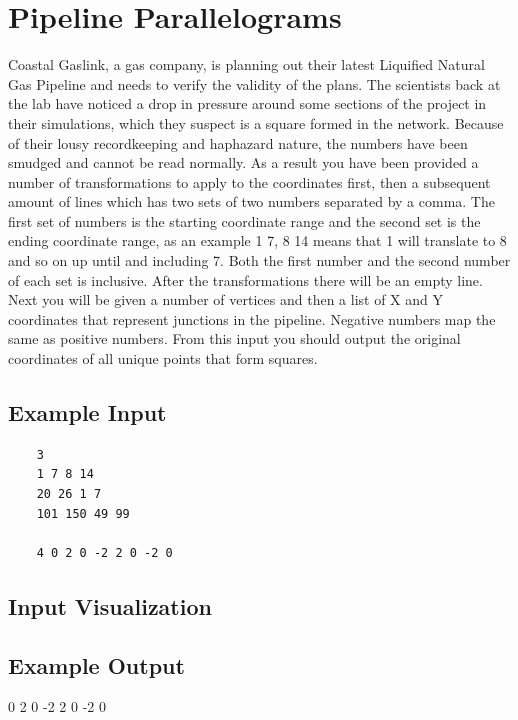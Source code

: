 \documentclass{article}
\begin{document}
\section{Pipeline Parallelograms}
Coastal Gaslink, a gas company, is planning out their latest Liquified Natural Gas Pipeline and needs to verify the validity of the plans. The scientists back at the lab have noticed a drop in pressure around some sections of the project in their simulations, which they suspect is a square formed in the network. Because of their lousy recordkeeping and haphazard nature, the numbers have been smudged and cannot be read normally. As a result you have been provided a number of transformations to apply to the coordinates first, then a subsequent amount of lines which has two sets of two numbers separated by a comma. The first set of numbers is the starting coordinate range and the second set is the ending coordinate range, as an example 1 7, 8 14 means that 1 will translate to 8 and so on up until and including 7. Both the first number and the second number of each set is inclusive. After the transformations there will be an empty line. Next you will be given a number of vertices and then a list of X and Y coordinates that represent junctions in the pipeline. Negative numbers map the same as positive numbers. From this input you should output the original coordinates of all unique points that form squares.
\subsection{Example Input}
\begin{verbatim}
    3
    1 7 8 14
    20 26 1 7
    101 150 49 99
    
    4 0 2 0 -2 2 0 -2 0
\end{verbatim}
\subsection{Input Visualization}
\subsection{Example Output}
0 2 0 -2 2 0 -2 0
\end{document}
